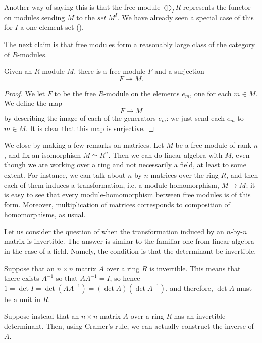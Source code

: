 Another way of saying this is that the free module $\bigoplus_I R$ represents
the functor on modules sending $M$ to the \emph{set} $ M^I$. We have already seen a special case of this for $I$ a
one-element set ().

The next claim is that free modules form a reasonably large class of the
category of $R$-modules.

\begin{proposition} \label{freesurjection} 
Given an $R$-module $M$, there is a free module $F$ and a surjection
\[ F \twoheadrightarrow M.  \]
\end{proposition} 
\begin{proof} 
We let $F$ to be the free $R$-module on the elements $e_m$, one for each $m
\in M$. We define the map
\[ F \to M  \]
by describing the image of each of the generators $e_m$: we just send each
$e_m$ to $m \in M$. It is clear that this map is surjective.
\end{proof} 


We close by making a few remarks on matrices.
Let $M$ be a free module of rank $n$, and fix an isomorphism $M \simeq R^n$.
Then we can do linear algebra with $M$, even though we are working over a
ring and not necessarily a field, at least to some extent.
For instance, we can talk about $n$-by-$n$ matrices over the ring $R$, and
then each of them induces a transformation, i.e. a module-homomorphism, $M \to
M$; it is easy to see that every module-homomorphism between free modules is
of this form. Moreover, multiplication of matrices corresponds to composition
of homomorphisms, as usual.
 
\begin{example} Let us consider the question of when the transformation
induced by an $n$-by-$n$ matrix is invertible. The answer is similar to the
familiar one from linear algebra in the case of a field. Namely, the condition
is that the determinant be invertible.

Suppose that an $n \times n$ matrix $A$ over a ring $R$ is invertible. This
means that there exists $A^{-1}$ so that $A A^{-1} = I$, so hence
$1 = \det I = \det(A A^{-1}) = (\det A) (\det A^{-1})$, and therefore, 
$\det A$ must be a unit in $R$.

Suppose instead that an $n \times n$ matrix $A$ over a ring $R$ has an
invertible determinant. Then, using Cramer's rule, we can actually construct
the inverse of $A$.
\end{example} 


